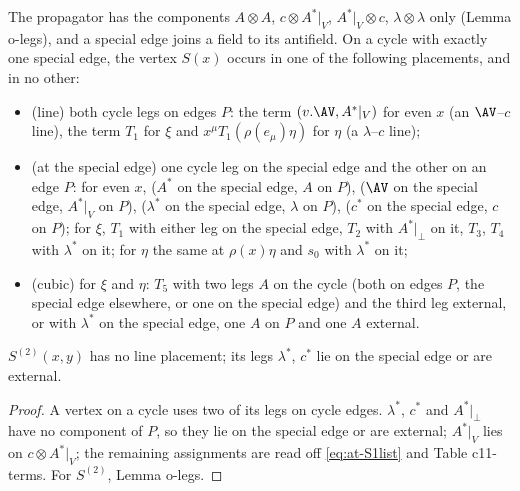 \begin{lemma}
\label{lem:at-place}
The propagator has the components $A\otimes A$, $c\otimes A^*|_V$, $A^*|_V\otimes c$, $\lambda\otimes\lambda$ only (Lemma o-legs), and a special edge joins a field to its antifield. On a cycle with exactly one special edge, the vertex $S(x)$ occurs in one of the following placements, and in no other:
\begin{itemize}
\item (line) both cycle legs on edges $P$: the term $(v.\AV,A^*|_V)$ for even $x$ (an $\AV$--$c$ line), the term $T_1$ for $\xi$ and $x^\mu T_1(\rho(e_\mu)\eta)$ for $\eta$ (a $\lambda$--$c$ line);
\item (at the special edge) one cycle leg on the special edge and the other on an edge $P$: for even $x$, ($A^*$ on the special edge, $A$ on $P$), ($\AV$ on the special edge, $A^*|_V$ on $P$), ($\lambda^*$ on the special edge, $\lambda$ on $P$), ($c^*$ on the special edge, $c$ on $P$); for $\xi$, $T_1$ with either leg on the special edge, $T_2$ with $A^*|_\perp$ on it, $T_3$, $T_4$ with $\lambda^*$ on it; for $\eta$ the same at $\rho(x)\eta$ and $s_0$ with $\lambda^*$ on it;
\item (cubic) for $\xi$ and $\eta$: $T_5$ with two legs $A$ on the cycle (both on edges $P$, the special edge elsewhere, or one on the special edge) and the third leg external, or with $\lambda^*$ on the special edge, one $A$ on $P$ and one $A$ external.
\end{itemize}
$S^{(2)}(x,y)$ has no line placement; its legs $\lambda^*$, $c^*$ lie on the special edge or are external.
\end{lemma}

\begin{proof}
A vertex on a cycle uses two of its legs on cycle edges. $\lambda^*$, $c^*$ and $A^*|_\perp$ have no component of $P$, so they lie on the special edge or are external; $A^*|_V$ lies on $c\otimes A^*|_V$; the remaining assignments are read off \eqref{eq:at-S1list} and Table c11-terms. For $S^{(2)}$, Lemma o-legs.
\end{proof}

